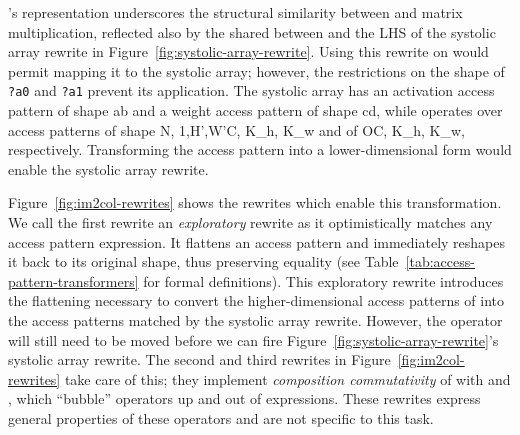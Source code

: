 \g's representation underscores
  the structural similarity
  between \ctd and matrix multiplication,
  reflected also by the shared
  between \ctd 
  and the LHS of the systolic array rewrite
  in Figure~\ref{fig:systolic-array-rewrite}.
Using this rewrite 
  on \ctd would permit mapping it to the systolic array; 
  however, 
  the restrictions
  on the shape of
  \texttt{?a0}
  and \texttt{?a1}
  prevent its application.
The systolic array has 
  an activation access pattern
  of shape \accesspatternshape
  {a}{b}
  and a weight access pattern
  of shape \accesspatternshape
  {c}{d},
  while \ctd operates over
  access patterns
  of shape \accesspatternshape
  {N, 1,H',W'}{C, K_h, K_w}
  and
  of \accesspatternshape
  {O}{C, K_h, K_w},
  respectively.
Transforming the access pattern
  into a lower-dimensional form
  would enable the systolic array rewrite.
  
Figure~\ref{fig:im2col-rewrites}
  shows the rewrites
  which enable this transformation.
We call the first rewrite
  an 
  \textit{exploratory} rewrite
  as it
  optimistically matches
  any access pattern expression.
It flattens 
  an access pattern
  and immediately reshapes it
  back to its original shape, thus preserving equality
  (see Table~\ref{tab:access-pattern-transformers}
  for formal definitions).
This exploratory rewrite introduces the flattening
  necessary
  to convert the higher-dimensional access patterns
  of \ctd
  into the access patterns
  matched by the systolic array rewrite.
However, the  operator
  will still need to be moved 
  before we can fire 
  Figure~\ref{fig:systolic-array-rewrite}'s
  systolic array rewrite.
The second and third rewrites
  in Figure~\ref{fig:im2col-rewrites}
  take care of this;
  they implement \textit{composition commutativity}
  of 
  with  and ,
  which ``bubble''  operators
  up and out of expressions.
These rewrites
  express general properties of these operators
  and are not specific
  to this task.
  
